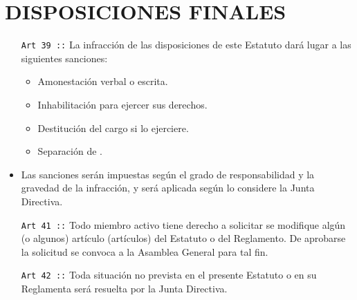 \chapter{DISPOSICIONES FINALES}
\begin{itemize}
  \item [\texttt{Art 39 ::}] La infracción de las disposiciones de este Estatuto dará lugar a las siguientes
  sanciones:
  \begin{itemize}
    \item Amonestación verbal o escrita.
    \item Inhabilitación para ejercer sus derechos.
    \item Destitución del cargo si lo ejerciere.
    \item Separación de \flae.

  \end{itemize}
  \item Las sanciones serán impuestas según el grado de responsabilidad y la gravedad de la infracción, y será aplicada según lo considere la Junta Directiva.
  \item [\texttt{Art 41 ::}] Todo miembro activo tiene derecho a solicitar se modifique algún (o algunos) artículo (artículos) del Estatuto o del Reglamento. De aprobarse la solicitud se convoca a la Asamblea General para tal fin.
  \item [\texttt{Art 42 ::}] Toda situación no prevista en el presente Estatuto o en su Reglamenta será resuelta por la Junta Directiva.
\end{itemize}
